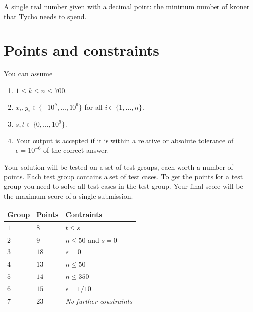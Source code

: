 A single real number given with a decimal point: the minimum number of kroner that Tycho needs to spend.

\section*{Points and constraints}

You can assume 
\begin{enumerate}
\item $1\leq k\leq n\leq 700$. %
\item $x_i, y_i\in \{-10^9,\ldots, 10^9\}$ for all $i\in\{1,\ldots,n\}$. %
\item $s,t\in \{0,\ldots, 10^9\}$. %
\item Your output is accepted if it is within a relative or absolute tolerance of $\epsilon = 10^{-6}$ of the correct answer.
\end{enumerate}


Your solution will be tested on a set of test groups, each worth a number of points.
Each test group contains a set of test cases.
To get the points for a test group you need to solve all test cases in the test group.
Your final score will be the maximum score of a single submission.

\medskip
\noindent
\begin{tabular}{lll}
  Group & Points & Contraints\\\hline
  $1$ & $8$ &  $t\leq s$\\
  $2$ & $9$ & $n\le 50$ and $s=0$\\
  $3$ & $18$ & $s=0$\\
  $4$ & $13$ & $n\leq 50$\\
  $5$ & $14$ & $n\leq 350$\\
  $6$ & $15$ & $\epsilon = 1/10$\\
  $7$ & $23$ & \emph{No further constraints}\\
\end{tabular}
